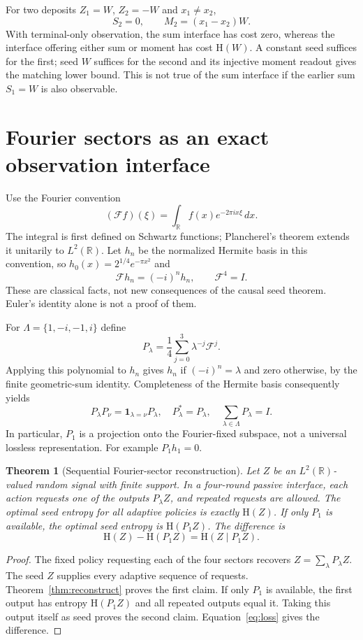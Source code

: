 \documentclass[11pt]{article}
\newtheorem{theorem}{Theorem}[section]
\theoremstyle{remark}\newtheorem{remark}[theorem]{Remark}
\newcommand{\HH}{\mathrm H}
\newcommand{\F}{\mathcal F}
\begin{document}
For two deposits $Z_1=W$, $Z_2=-W$ and $x_1\ne x_2$,
\[
 S_2=0,\qquad M_2=(x_1-x_2)W.
\]
With terminal-only observation, the sum interface has cost zero, whereas the
interface offering either sum or moment has cost $\HH(W)$. A constant seed
suffices for the first; seed $W$ suffices for the second and its injective moment
readout gives the matching lower bound. This is not true of the sum interface
if the earlier sum $S_1=W$ is also observable.

\section{Fourier sectors as an exact observation interface}
Use the Fourier convention
\[
 (\F f)(\xi)=\int_{\mathbb R}f(x)e^{-2\pi i x\xi}\,dx.
\]
The integral is first defined on Schwartz functions; Plancherel's theorem
extends it unitarily to $L^2(\mathbb R)$. Let $h_n$ be the normalized Hermite
basis in this convention, so $h_0(x)=2^{1/4}e^{-\pi x^2}$ and
\[
 \F h_n=(-i)^nh_n,\qquad \F^4=I.
\]
These are classical facts, not new consequences of the causal seed theorem.
Euler's identity alone is not a proof of them.

For $\Lambda=\{1,-i,-1,i\}$ define
\[
 P_\lambda=\frac14\sum_{j=0}^3\lambda^{-j}\F^j.
\]
Applying this polynomial to $h_n$ gives $h_n$ if $(-i)^n=\lambda$ and zero
otherwise, by the finite geometric-sum identity. Completeness of the Hermite
basis consequently yields
\[
 P_\lambda P_\nu=\mathbf1_{\lambda=\nu}P_\lambda,
 \quad P_\lambda^*=P_\lambda,\quad
 \sum_{\lambda\in\Lambda}P_\lambda=I.
\]
In particular, $P_1$ is a projection onto the Fourier-fixed subspace, not a
universal lossless representation. For example $P_1h_1=0$.

\begin{theorem}[Sequential Fourier-sector reconstruction]\label{thm:sectors}
Let $Z$ be an $L^2(\mathbb R)$-valued random signal with finite support. In a
four-round passive interface, each action requests one of the outputs
$P_\lambda Z$, and repeated requests are allowed. The optimal seed entropy
for all adaptive policies is exactly $\HH(Z)$.
If only $P_1$ is available, the optimal seed entropy is $\HH(P_1Z)$.
The difference is
\[
 \boxed{\HH(Z)-\HH(P_1Z)=\HH(Z\mid P_1Z).}
\]
\end{theorem}
\begin{proof}
The fixed policy requesting each of the four sectors recovers
$Z=\sum_\lambda P_\lambda Z$. The seed $Z$ supplies every adaptive sequence
of requests. Theorem~\ref{thm:reconstruct} proves the first claim. If only
$P_1$ is available, the first output has entropy $\HH(P_1Z)$ and all repeated
outputs equal it. Taking this output itself as seed proves the second claim.
Equation~\eqref{eq:loss} gives the difference.
\end{proof}
\end{document}
